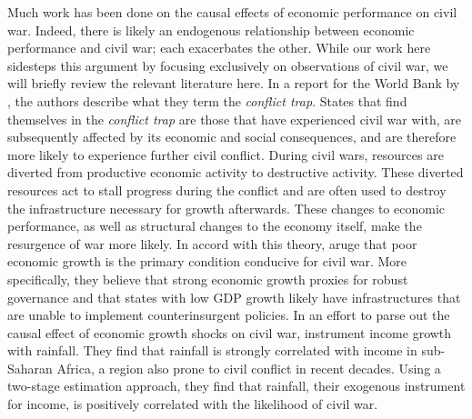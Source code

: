 Much work has been done on the causal effects of economic performance on civil war.  Indeed, there is likely an endogenous relationship between economic performance and civil war; each exacerbates the other.  While our work here sidesteps this argument by focusing exclusively on observations of civil war, we will briefly review the relevant literature here.  In a report for the World Bank by \cite{collier:etal:2003}, the authors describe what they term the \textit{conflict trap}.  States that find themselves in the \textit{conflict trap} are those that have experienced civil war with, are subsequently affected by its economic and social consequences, and are therefore more likely to experience further civil conflict.  During civil wars, resources are diverted from productive economic activity to destructive activity.  These diverted resources act to stall progress during the conflict and are often used to destroy the infrastructure necessary for growth afterwards.  These changes to economic performance, as well as structural changes to the economy itself, make the resurgence of war more likely.  In accord with this theory, \cite{fearon:laitin:2003} aruge that poor economic growth is the primary condition conducive for civil war.  More specifically, they believe that strong economic growth proxies for robust governance and that states with low GDP growth likely have infrastructures that are unable to implement counterinsurgent policies.  In an effort to parse out the causal effect of economic growth shocks on civil war, \cite{miguel:etal:2004} instrument income growth with rainfall.  They find that rainfall is strongly correlated with income in sub-Saharan Africa, a region also prone to civil conflict in recent decades.   Using a two-stage estimation approach, they find that rainfall, their exogenous instrument for income, is positively correlated with the likelihood of civil war.




